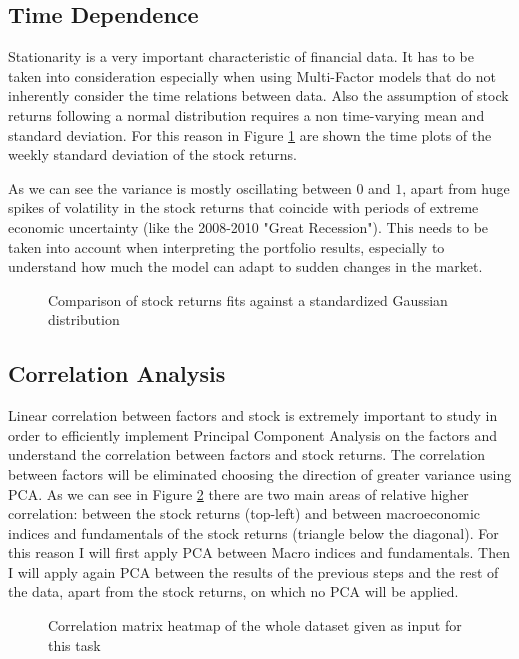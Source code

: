 \subsection{Time Dependence}
Stationarity is a very important characteristic of financial data. It has to be taken into consideration especially when using Multi-Factor models that do not inherently consider the time relations between data. Also the assumption of stock returns following a normal distribution requires a non time-varying mean and standard deviation. For this reason in Figure \ref{fig:stock-std-plot} are shown the time plots of the weekly standard deviation of the stock returns.

As we can see the variance is mostly oscillating between $0$ and $1$, apart from huge spikes of volatility in the stock returns that coincide with periods of extreme economic uncertainty (like the 2008-2010 "Great Recession"). This needs to be taken into account when interpreting the portfolio results, especially to understand how much the model can adapt to sudden changes in the market.

\begin{figure}[htb]
\centering

\caption{Comparison of stock returns fits against a standardized Gaussian distribution}
\label{fig:stock-std-plot}
\end{figure}


\subsection{Correlation Analysis}
Linear correlation between factors and stock is extremely important to study in order to efficiently implement Principal Component Analysis on the factors and understand the correlation between factors and stock returns. The correlation between factors will be eliminated choosing the direction of greater variance using PCA. As we can see in Figure \ref{fig:correlation-heatmap} there are two main areas of relative higher correlation: between the stock returns (top-left) and between macroeconomic indices and fundamentals of the stock returns (triangle below the diagonal).
For this reason I will first apply PCA between Macro indices and fundamentals. Then I will apply again PCA between the results of the previous steps and the rest of the data, apart from the stock returns, on which no PCA will be applied.

\begin{figure}[htb]
\centering

\caption{Correlation matrix heatmap of the whole dataset given as input for this task}
\label{fig:correlation-heatmap}
\end{figure}

